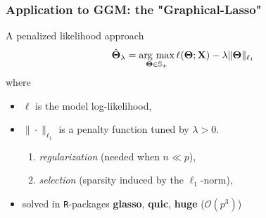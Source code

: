 \begin{frame}
  \frametitle{Application to GGM: the "Graphical-Lasso"} 

  \begin{block}{A penalized likelihood approach}
    \vspace{-1em}
    \begin{equation*}
      \hat{\boldsymbol\Theta}_\lambda=\mathop{\mathrm{arg\ max}}_{\boldsymbol\Theta \in \mathbb{S}_+}
      \ell(\boldsymbol\Theta;\mathbf{X})-\lambda
      \|\boldsymbol\Theta\|_{\ell_1}
    \end{equation*}
  where
  \begin{itemize}
  \item $\mathcal{\ell}$ is the model log-likelihood,
  \item $\|\cdot\|_{\ell_1}$ is a \alert{penalty function} tuned by
    $\lambda>0$. 
    \vfill
      \begin{enumerate}
      \item \textit{regularization} (needed when $n \ll p$), 
      \item \textit{selection} (sparsity induced by the $\ell_1$-norm),
      \end{enumerate}
    \item     solved    in     \texttt{R}-packages    \textbf{glasso},
      \textbf{quic}, \textbf{huge} ($\mathcal{O}(p^3)$)
  \end{itemize}
\end{block}

\end{frame}


